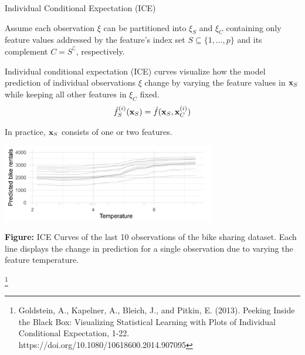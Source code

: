 \documentclass[11pt,compress,t,notes=noshow, xcolor=table]{beamer}
\begin{document}
\begin{vbframe}{Individual Conditional Expectation (ICE)}

Assume each observation $\xi$ can be partitioned into $\xi_S$ and $\xi_C$ containing only feature values addressed by the feature's index set $S \subseteq \{1, \dots, p\}$ and its complement $C = S^\complement$, respectively.

\lz

Individual conditional expectation (ICE) curves visualize how the model prediction of individual observations $\xi$
change by varying the feature values in $\xv_S$ while keeping all other features in $\xi_C$ fixed.
$$\fh_{S}^{(i)}(\xv_S) = \fh(\xv_S, \xi_C)$$

In practice, $\xv_S$ consists of one or two features.

\vspace{-0.2cm}
\begin{center}
\includegraphics[width=0.7\textwidth]{figure_man/ICE01.png}
\end{center}
\vspace{-0.3cm}
\scriptsize{\textbf{Figure:} ICE Curves of the last 10 observations of the bike sharing dataset. Each line displays the change in prediction for a single observation due to varying the feature temperature.\par}

\footnote[frame]{Goldstein, A., Kapelner, A., Bleich, J., and Pitkin, E. (2013). Peeking Inside the Black Box: Visualizing Statistical Learning with Plots of Individual Conditional Expectation, 1-22. https://doi.org/10.1080/10618600.2014.907095}
\end{vbframe}
\end{document}
